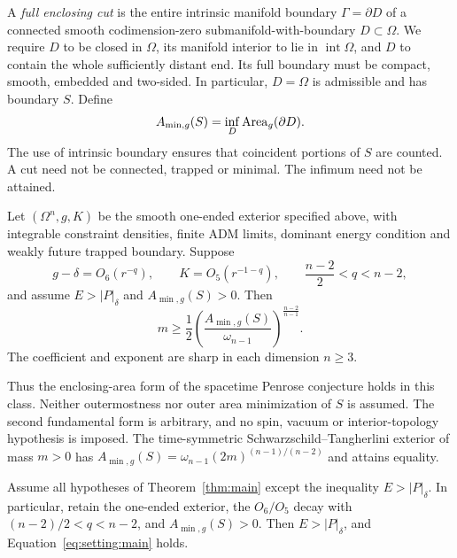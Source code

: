 \begin{definition}\label{def:fullcuts}
A \emph{full enclosing cut} is the entire intrinsic manifold boundary
$\Gamma=\partial D$ of a connected smooth codimension-zero
submanifold-with-boundary $D\subset\Omega$. We require $D$ to be
closed in $\Omega$, its manifold interior to lie in
$\operatorname{int}\Omega$, and $D$ to contain the whole sufficiently
distant end. Its full boundary must be compact, smooth, embedded and
two-sided. In particular, $D=\Omega$ is admissible and has boundary $S$.
Define
\begin{equation}\label{eq:setting:minarea}
 A_{\min,g}(S)=\inf_D\operatorname{Area}_g(\partial D).
\end{equation}
The use of intrinsic boundary ensures that coincident portions of $S$
are counted. A cut need not be connected, trapped or minimal. The
infimum need not be attained.
\end{definition}

\begin{theorem}\label{thm:main}
Let $(\Omega^n,g,K)$ be the smooth one-ended exterior specified above,
with integrable constraint densities, finite ADM limits, dominant
energy condition and weakly future trapped boundary. Suppose
\[
 g-\delta=O_6(r^{-q}),\qquad K=O_5(r^{-1-q}),\qquad
 \frac{n-2}{2}<q<n-2,
\]
and assume $E>|P|_\delta$ and $A_{\min,g}(S)>0$. Then
\begin{equation}\label{eq:setting:main}
 m\geq\frac12\left(\frac{A_{\min,g}(S)}{\omega_{n-1}}
                 \right)^{\frac{n-2}{n-1}}.
\end{equation}
The coefficient and exponent are sharp in each dimension $n\geq3$.
\end{theorem}

Thus the enclosing-area form of the spacetime Penrose conjecture holds
in this class. Neither outermostness nor outer area minimization of $S$
is assumed. The second fundamental form is arbitrary, and no spin,
vacuum or interior-topology hypothesis is imposed. The time-symmetric
Schwarzschild--Tangherlini exterior of mass $m>0$ has
$A_{\min,g}(S)=\omega_{n-1}(2m)^{(n-1)/(n-2)}$ and attains equality.

\begin{corollary}
\label{cor:automatic-timelikeness}
Assume all hypotheses of Theorem~\ref{thm:main} except the inequality
$E>|P|_\delta$. In particular, retain the one-ended exterior, the
$O_6/O_5$ decay with $(n-2)/2<q<n-2$, and $A_{\min,g}(S)>0$.
Then $E>|P|_\delta$, and Equation~\eqref{eq:setting:main} holds.
\end{corollary}

